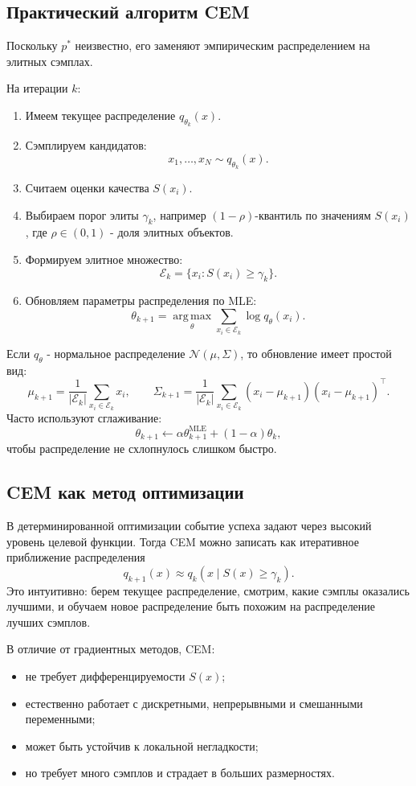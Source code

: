 \documentclass[11pt,a4paper]{article}
\newcommand{\argmax}{\operatorname*{arg\,max}}
\newcommand{\1}{\mathbf{1}}
\begin{document}
\subsection*{Практический алгоритм CEM}
Поскольку $p^*$ неизвестно, его заменяют эмпирическим распределением на элитных сэмплах.

На итерации $k$:
\begin{enumerate}
    \item Имеем текущее распределение $q_{\theta_k}(x)$.
    \item Сэмплируем кандидатов:
    \[
        x_1,\dots,x_N \sim q_{\theta_k}(x).
    \]
    \item Считаем оценки качества $S(x_i)$.
    \item Выбираем порог элиты $\gamma_k$, например $(1-\rho)$-квантиль по значениям $S(x_i)$, где $\rho\in(0,1)$ - доля элитных объектов.
    \item Формируем элитное множество:
    \[
        \mathcal E_k = \{x_i: S(x_i)\ge \gamma_k\}.
    \]
    \item Обновляем параметры распределения по MLE:
    \[
        \theta_{k+1} = \argmax_\theta \sum_{x_i\in\mathcal E_k}\log q_\theta(x_i).
    \]
\end{enumerate}

Если $q_\theta$ - нормальное распределение $\mathcal N(\mu,\Sigma)$, то обновление имеет простой вид:
\[
    \mu_{k+1}=\frac1{|\mathcal E_k|}\sum_{x_i\in\mathcal E_k}x_i,
    \qquad
    \Sigma_{k+1}=\frac1{|\mathcal E_k|}\sum_{x_i\in\mathcal E_k}(x_i-\mu_{k+1})(x_i-\mu_{k+1})^\top.
\]
Часто используют сглаживание:
\[
    \theta_{k+1}\leftarrow \alpha\theta_{k+1}^{\text{MLE}}+(1-\alpha)\theta_k,
\]
чтобы распределение не схлопнулось слишком быстро.

\subsection*{CEM как метод оптимизации}
В детерминированной оптимизации событие успеха задают через высокий уровень целевой функции. Тогда CEM можно записать как итеративное приближение распределения
\[
    q_{k+1}(x) \approx q_k(x\mid S(x)\ge \gamma_k).
\]
Это интуитивно: берем текущее распределение, смотрим, какие сэмплы оказались лучшими, и обучаем новое распределение быть похожим на распределение лучших сэмплов.

В отличие от градиентных методов, CEM:
\begin{itemize}
    \item не требует дифференцируемости $S(x)$;
    \item естественно работает с дискретными, непрерывными и смешанными переменными;
    \item может быть устойчив к локальной негладкости;
    \item но требует много сэмплов и страдает в больших размерностях.
\end{itemize}
\end{document}
